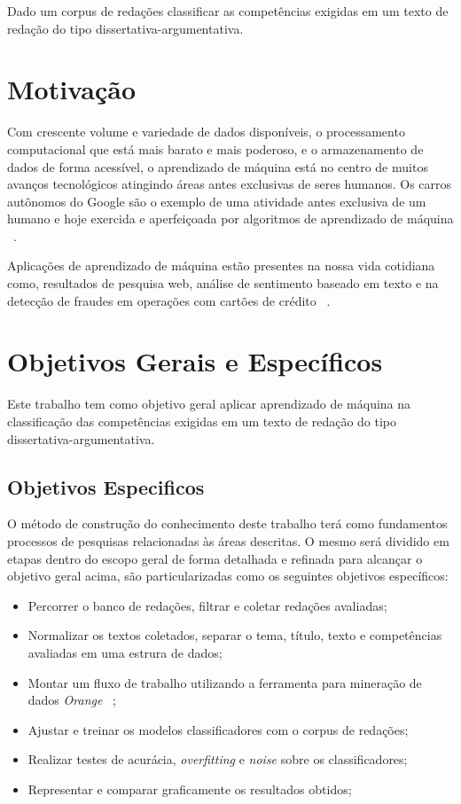 Dado um corpus de redações classificar as competências exigidas em um texto de redação do tipo dissertativa-argumentativa.

\section{Motivação}

Com crescente volume e variedade de dados disponíveis, o processamento computacional que está mais barato e mais poderoso, e o armazenamento de dados de forma acessível, o aprendizado de máquina está no centro de muitos avanços tecnológicos atingindo áreas antes exclusivas de seres humanos. Os carros autônomos do Google são o exemplo de uma atividade antes exclusiva de um humano e hoje exercida e aperfeiçoada por algoritmos de aprendizado de máquina ~\cite{waymo:2017}.

Aplicações de aprendizado de máquina estão presentes na nossa vida cotidiana como, resultados de pesquisa web, análise de sentimento baseado em texto e na detecção de fraudes em operações com cartões de crédito ~\cite{batista1999aplicando}.

\section{Objetivos Gerais e Específicos}

Este trabalho tem como objetivo geral aplicar aprendizado de máquina na classificação das competências exigidas em um texto de redação do tipo dissertativa-argumentativa.

\subsection{Objetivos Especificos}

O método de construção do conhecimento deste trabalho terá como fundamentos processos de pesquisas relacionadas às áreas descritas. O mesmo será dividido em etapas dentro do escopo geral de forma detalhada e refinada para alcançar o objetivo geral acima, são particularizadas como os seguintes objetivos específicos:

\begin{itemize}
 \item Percorrer o banco de redações, filtrar e coletar redações avaliadas;
 \item Normalizar os textos coletados, separar o tema, título, texto e competências avaliadas em uma estrura de dados;
 \item Montar um fluxo de trabalho utilizando a ferramenta para mineração de dados \textit{Orange} ~\cite{JMLR:demsar13a};
 \item Ajustar e treinar os modelos classificadores com o corpus de redações; 
 \item Realizar testes de acurácia, \textit{overfitting} e \textit{noise} sobre os classificadores;
 \item Representar e comparar graficamente os resultados obtidos;
\end{itemize}

